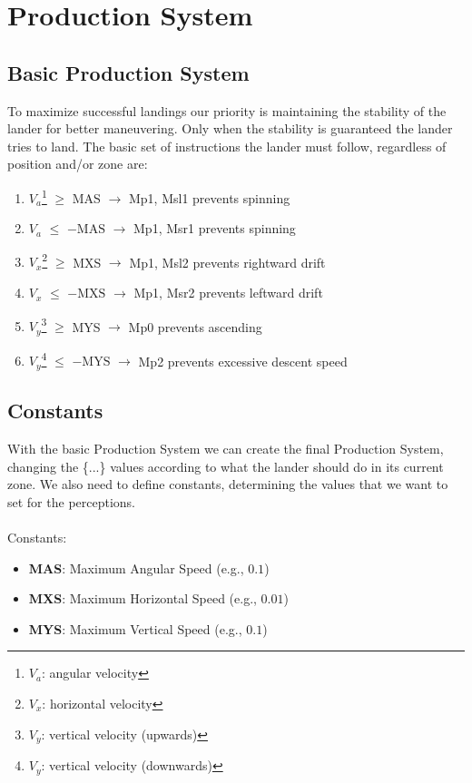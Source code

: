 \documentclass{article}
\begin{document}
\section{Production System}

\subsection{Basic Production System}
To maximize successful landings our priority is maintaining the stability of the lander for better maneuvering. Only when the stability is guaranteed the lander tries to land. The basic set of instructions the lander must follow, regardless of position and/or zone are:

\begin{enumerate}
    \item $V_a$\footnote{$V_a$: angular velocity} $\geq$ MAS $\rightarrow$ Mp1, Msl1 \hfill prevents spinning
    \item $V_a$ $\leq$ $-\text{MAS}$ $\rightarrow$ Mp1, Msr1 \hfill prevents spinning
    \item $V_x$\footnote{$V_x$: horizontal velocity} $\geq$ MXS $\rightarrow$ Mp1, Msl2 \hfill prevents rightward drift
    \item $V_x$ $\leq$ $-\text{MXS}$ $\rightarrow$ Mp1, Msr2 \hfill prevents leftward drift
    \item $V_y$\footnote{$V_y$: vertical velocity (upwards)} $\geq$ MYS $\rightarrow$ Mp0 \hfill prevents ascending
    \item $V_y$\footnote{$V_y$: vertical velocity (downwards)} $\leq$ $-\text{MYS}$ $\rightarrow$ Mp2 \hfill prevents excessive descent speed
\end{enumerate}

\subsection{Constants}
With the basic Production System we can create the final Production System, changing the \{...\} values according to what the lander should do in its current zone. We also need to define constants, determining the values that we want to set for the perceptions.
\noindent \\ \\ Constants:
\begin{itemize}
    \item \textbf{MAS}: Maximum Angular Speed (e.g., $0.1$)
    \item \textbf{MXS}: Maximum Horizontal Speed (e.g., $0.01$)
    \item \textbf{MYS}: Maximum Vertical Speed (e.g., $0.1$)
\end{itemize}
\end{document}
